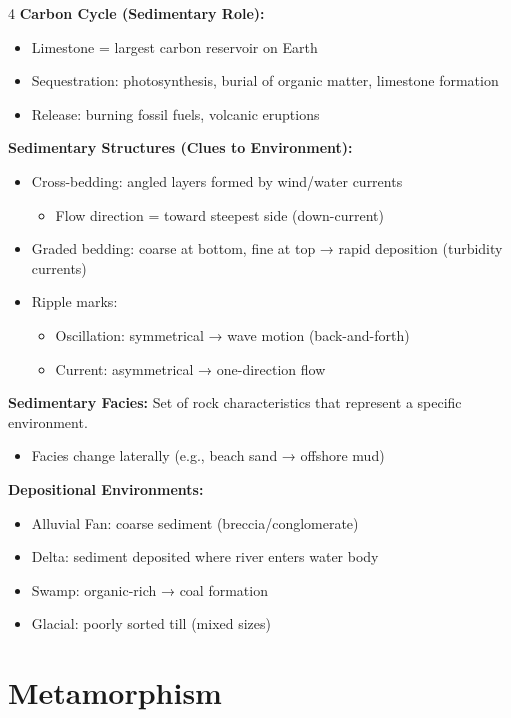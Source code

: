 \documentclass[10pt]{article}
\begin{document}
\begin{multicols}{4}
\textbf{Carbon Cycle (Sedimentary Role):}
\begin{itemize}
\item Limestone = largest carbon reservoir on Earth
\item Sequestration: photosynthesis, burial of organic matter, limestone formation
\item Release: burning fossil fuels, volcanic eruptions
\end{itemize}

\textbf{Sedimentary Structures (Clues to Environment):}
\begin{itemize}
\item Cross-bedding: angled layers formed by wind/water currents
\begin{itemize}
\item Flow direction = toward steepest side (down-current)
\end{itemize}
\item Graded bedding: coarse at bottom, fine at top → rapid deposition (turbidity currents)
\item Ripple marks:
\begin{itemize}
\item Oscillation: symmetrical → wave motion (back-and-forth)
\item Current: asymmetrical → one-direction flow
\end{itemize}
\end{itemize}

\textbf{Sedimentary Facies:}
Set of rock characteristics that represent a specific environment.
\begin{itemize}
\item Facies change laterally (e.g., beach sand → offshore mud)
\end{itemize}

\textbf{Depositional Environments:}
\begin{itemize}
\item Alluvial Fan: coarse sediment (breccia/conglomerate)
\item Delta: sediment deposited where river enters water body
\item Swamp: organic-rich → coal formation
\item Glacial: poorly sorted till (mixed sizes)
\end{itemize}

\section*{Metamorphism}


\end{multicols}
\end{document}
